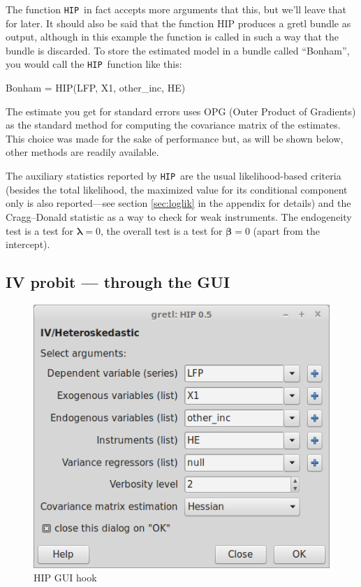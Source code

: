 \documentclass[a4paper,10pt]{article}
\newcommand{\HIP}{\texttt{HIP}}
\newcommand{\ProbitPar}{\bm{\beta}}
\newcommand{\Covars}{\bm{\lambda}}
\begin{document}
The function \HIP\ in fact accepts more arguments that this, but we'll
leave that for later. It should also be said that the function HIP
produces a gretl bundle as output, although in this example the
function is called in such a way that the bundle is discarded.  To
store the estimated model in a bundle called ``Bonham'', you would
call the \HIP\ function like this:
\begin{code}
  Bonham = HIP(LFP, X1, other_inc, HE)
\end{code}

The estimate you get for standard errors uses OPG (Outer Product
of Gradients) as the standard method for computing the covariance
matrix of the estimates. This choice was made for the sake of
performance but, as will be shown below, other methods are readily
available.

The auxiliary statistics reported by \HIP\ are the usual
likelihood-based criteria (besides the total likelihood, the maximized
value for its conditional component only is also reported---see
section \ref{sec:loglik} in the appendix for details) and the
Cragg--Donald statistic as a way to check for weak instruments. The
endogeneity test is a test for $\Covars = 0$, the overall test is a
test for $\ProbitPar = 0$ (apart from the intercept).


\subsection{IV probit --- through the GUI}

\begin{figure}[htbp]
  \centering
  \includegraphics[scale=0.4]{HIP-sshot1.png}
  \caption{HIP GUI hook}
  \label{fig:HIP_window}
\end{figure}
\end{document}

